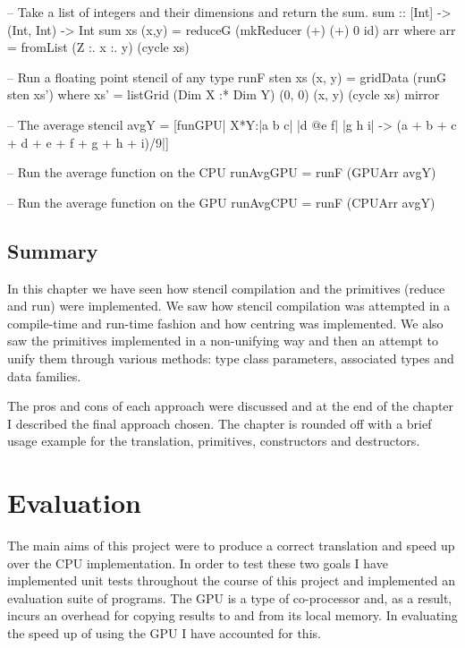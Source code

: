 \documentclass[12pt,a4paper,twoside]{scrbook}
\begin{document}
\begin{hflisting}[label=lst:example,
caption=Usage of the final system taken from the unit tests.]

-- Take a list of integers and their dimensions and return the sum.
sum :: [Int] -> (Int, Int) -> Int
sum xs (x,y) =  reduceG (mkReducer (+) (+) 0 id) arr
    where arr = fromList (Z :. x :. y) (cycle xs)

-- Run a floating point stencil of any type
runF sten xs (x, y) = gridData (runG sten xs')
    where xs' = listGrid (Dim X :* Dim Y)
                         (0, 0) (x, y)
                         (cycle xs)
                         mirror

-- The average stencil
avgY = [funGPU| X*Y:|a  b c|
                    |d @e f|
                    |g  h i| ->
        (a + b + c + d + e + f + g + h + i)/9|]

-- Run the average function on the CPU
runAvgGPU = runF (GPUArr avgY)

-- Run the average function on the GPU
runAvgCPU = runF (CPUArr avgY)

\end{hflisting}



\section{Summary}

In this chapter we have seen how stencil compilation and the primitives (reduce
and run) were implemented. We saw how stencil compilation was attempted in a
compile-time and run-time fashion and how centring was implemented. We also saw
the primitives implemented in a non-unifying way and then an attempt to unify
them through various methods: type class parameters, associated types and data
families.

The pros and cons of each approach were discussed and at the end of the chapter
I described the final approach chosen. The chapter is rounded off with a brief
usage example for the translation, primitives, constructors and destructors.

\chapter{Evaluation}

The main aims of this project were to produce a correct translation and speed up
over the CPU implementation. In order to test these two goals I have implemented
unit tests throughout the course of this project and implemented an evaluation
suite of programs. The GPU is a type of co-processor and, as a result, incurs an
overhead for copying results to and from its local memory. In evaluating the
speed up of using the GPU I have accounted for this.
\end{document}
